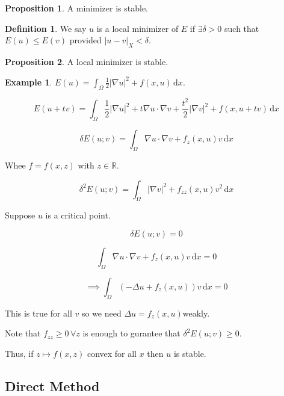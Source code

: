 \documentclass{article}
\theoremstyle{definition}
\newtheorem{example}{Example}
\newtheorem{definition}{Definition}
\newtheorem{proposition}{Proposition}
\begin{document}
\begin{proposition}
    A minimizer is stable.
\end{proposition}

\begin{definition}
    We say \(u\) is a local minimizer of \(E\) if \(\exists \delta > 0\) such that \(E(u) \leq E(v)\) provided \(\vert u-v \vert_X < \delta\).
\end{definition}

\begin{proposition}
    A local minimizer is stable.
\end{proposition}

\begin{example}
    \(E(u) = \int_{\Omega} \frac{1}{2}\vert \nabla u \vert ^2 + f(x,u) \,\mathrm{d}x \).

    \[
        E(u+tv) = \int_{\Omega} \frac{1}{2} \vert \nabla u \vert ^2 + t \nabla u \cdot \nabla v + \frac{t^2}{2}\vert \nabla v \vert ^2 + f(x,u+tv) \,\mathrm{d}x 
    \]

    \[
        \delta E(u;v) = \int_{\Omega} \nabla u \cdot \nabla v +f_z(x,u)v \,\mathrm{d}x
    \] 

    Whee \(f = f(x,z)\) with \(z\in \mathbb{R}\).

    \[
        \delta^2 E(u;v) = \int_{\Omega} \vert \nabla v \vert ^2 + f_{z z} (x,u) v^2 \,\mathrm{d}x 
    \]

    Suppose \(u\) is a critical point.

    \[
        \delta E(u;v) = 0
    \]

    \[
        \int_{\Omega} \nabla u \cdot \nabla v +f_z(x,u)v \,\mathrm{d}x = 0
    \]

    \[
        \implies \int_{\Omega} \left( - \Delta u + f_z(x,u) \right) v \,\mathrm{d}x = 0
    \]

    This is true for all \(v\) so we need \(\Delta u = f_z(x,u)\)weakly.

    Note that \(f_{z z} \geq 0\, \forall z\) is enough to gurantee that \(\delta^2 E(u;v) \geq 0\).
    
    Thus, if \(z \mapsto f(x,z)\) convex for all \(x\) then \(u\) is stable.

\end{example}

\subsection*{Direct Method}
\end{document}
